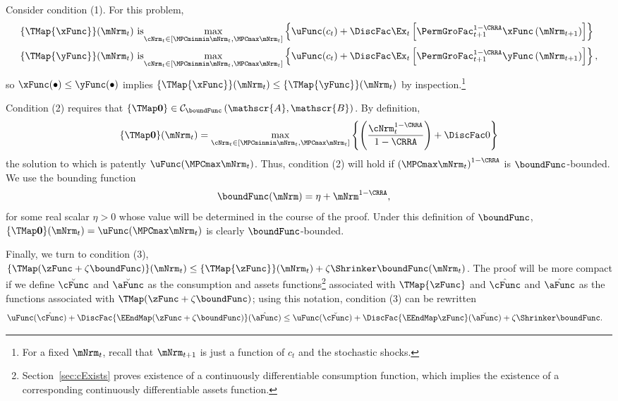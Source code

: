 \documentclass[\econtexRoot/BufferStockTheory]{subfiles}
\begin{document}
Consider condition (1). For this problem,
\begin{align*}
\{\TMap{\mathfrak{\xFunc}}\}(\mNrm_{t}) &\mbox{~is}\underset{\cNrm_{t} \in
[\MPCminmin \mNrm_{t}, \MPCmax \mNrm_{t}]
}\max \left\{
\uFunc(c_{t})+\DiscFac \Ex_{t}\left[ {\PermGroFac}_{t+1}^{1-\CRRA }{\mathfrak{\xFunc}}
\left( {\mNrm}_{t+1}\right) \right] \right\}  \notag  \label{eq:condition1}
\\
\{\TMap{\mathfrak{\yFunc}}\}(\mNrm_{t}) &\mbox{~is}\underset{\cNrm_{t} \in
[\MPCminmin \mNrm_{t}, \MPCmax \mNrm_{t}]
}\max \left\{
\uFunc(c_{t})+\DiscFac \Ex_{t}\left[ {\PermGroFac}_{t+1}^{1-\CRRA }{\mathfrak{\yFunc}}
\left( {\mNrm}_{t+1}\right) \right] \right\} ,  \notag
\end{align*}%
so ${\mathfrak{\xFunc}}(\bullet) \leq {\mathfrak{\yFunc}}(\bullet)$ implies $\{\TMap{\mathfrak{\xFunc}}\}(\mNrm_{t}) \leq \{\TMap{\mathfrak{\yFunc}} \}(\mNrm_{t})$ by inspection.\footnote{For a fixed $\mNrm_{t}$, recall that ${\mNrm}_{t+1}$ is just a function of $c_{t}$ and the
stochastic shocks.}

Condition (2) requires that $\{\TMap\mathbf{0}\}\in \mathcal{C}_{\boundFunc}\left(\mathscr{A},\mathscr{B}\right)$. By definition,
\begin{equation*}
\{\TMap \mathbf{0}\}(\mNrm_{t}) = \max_{\cNrm_{t} \in
[\MPCminmin \mNrm_{t}, \MPCmax \mNrm_{t}]
}\left\{ \left( \frac{\cNrm_{t}^{1-\CRRA }}{1-\CRRA }\right) +\DiscFac 0\right\}
\end{equation*}
the solution to which is patently
$\uFunc(\MPCmax \mNrm_{t})$. Thus, condition (2)
will hold if ${(\MPCmax \mNrm_{t})}^{1-\CRRA}$ is $\boundFunc$-bounded.  We use
the bounding function
\begin{equation}\begin{gathered}\begin{aligned}
  \label{eq:boundFunc}
  \boundFunc(\mNrm)  & = \eta + \mNrm^{1-\CRRA},
\end{aligned}\end{gathered}\end{equation}
for some real scalar $\eta > 0$ whose value will be determined in the
course of the proof. Under this definition of $\boundFunc$,
$\{\TMap\mathbf{0}\}(\mNrm_{t})= \uFunc(\MPCmax \mNrm_{t})$
is clearly
$\boundFunc$-bounded.

Finally, we turn to condition (3), $\{\TMap({\zFunc} +\zeta\boundFunc
)\}(\mNrm_{t}) \leq \{\TMap{\zFunc}\}(\mNrm_{t}) +\zeta \Shrinker
\boundFunc(\mNrm_{t})$. The proof will be more compact if we define
$\breve{\cFunc}$ and $\breve{\aFunc}$ as the consumption and assets
functions\footnote{Section~\ref{sec:cExists} proves existence of a
  continuously differentiable consumption function, which implies the
  existence of a corresponding continuously differentiable assets
  function.}  associated with $\TMap{\zFunc}$ and $\hat{\cFunc}$ and
$\hat{\aFunc}$ as the functions associated with $\TMap({\zFunc+\zeta
  \boundFunc})$; using this notation, condition (3) can be rewritten
\begin{align*}
\uFunc(\hat{\cFunc})+\DiscFac \{\EEndMap (\zFunc+\zeta \boundFunc) \}(\hat{\aFunc})  & \leq  \uFunc(\breve{\cFunc})+\DiscFac \{\EEndMap \zFunc \}(\breve{\aFunc})  + \zeta \Shrinker \boundFunc.
\end{align*}
\end{document}
